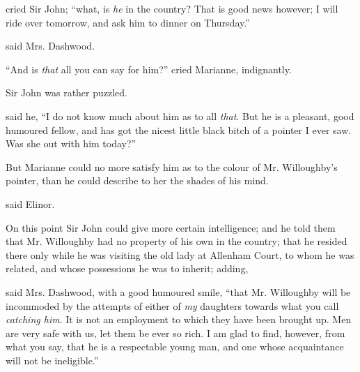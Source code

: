  cried Sir John; “what, is {\em he} in the country? That is good news however; I will ride over tomorrow, and ask him to dinner on Thursday.”

 said Mrs. Dashwood.




“And is {\em that} all you can say for him?” cried Marianne, indignantly. 

Sir John was rather puzzled.

 said he, “I do not know much about him as to all {\em that}. But he is a pleasant, good humoured fellow, and has got the nicest little black bitch of a pointer I ever saw. Was she out with him today?”

But Marianne could no more satisfy him as to the colour of Mr. Willoughby's pointer, than he could describe to her the shades of his mind.

 said Elinor. 

On this point Sir John could give more certain intelligence; and he told them that Mr. Willoughby had no property of his own in the country; that he resided there only while he was visiting the old lady at Allenham Court, to whom he was related, and whose possessions he was to inherit; adding, 

 said Mrs. Dashwood, with a good humoured smile, “that Mr. Willoughby will be incommoded by the attempts of either of {\em my} daughters towards what you call {\em catching him}. It is not an employment to which they have been brought up. Men are very safe with us, let them be ever so rich. I am glad to find, however, from what you say, that he is a respectable young man, and one whose acquaintance will not be ineligible.”

